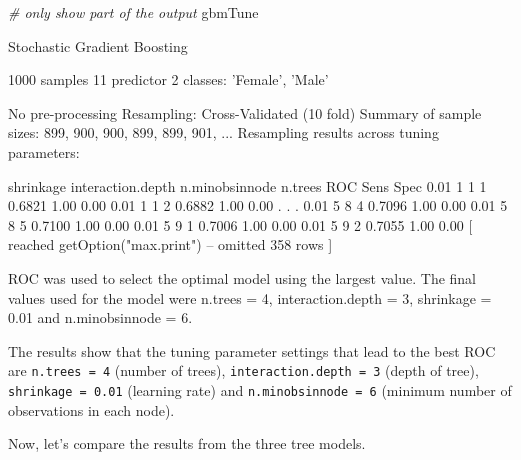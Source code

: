 \documentclass[12pt,]{krantz}
\makeatletter
\newenvironment{Shaded}{\begin{snugshade}}{\end{snugshade}}
\newcommand{\CommentTok}[1]{\textcolor[rgb]{0.37,0.37,0.37}{\textit{#1}}}
\newcommand{\NormalTok}[1]{#1}
\newenvironment{kframe}{%
\medskip{}
\setlength{\fboxsep}{.8em}
 \def\at@end@of@kframe{}%
 \ifinner\ifhmode%
  \def\at@end@of@kframe{\end{minipage}}%
  \begin{minipage}{\columnwidth}%
 \fi\fi%
 \def\FrameCommand##1{\hskip\@totalleftmargin \hskip-\fboxsep
 \colorbox{shadecolor}{##1}\hskip-\fboxsep
     \hskip-\linewidth \hskip-\@totalleftmargin \hskip\columnwidth}%
 \MakeFramed {\advance\hsize-\width
   \@totalleftmargin\z@ \linewidth\hsize
   \@setminipage}}%
 {\par\unskip\endMakeFramed%
 \at@end@of@kframe}
\renewenvironment{Shaded}{\begin{kframe}}{\end{kframe}}
\makeatother
\begin{document}
\begin{Shaded}
\begin{Highlighting}[]
\CommentTok{# only show part of the output}
\NormalTok{gbmTune}
\end{Highlighting}
\end{Shaded}

\begin{Shaded}
\begin{Highlighting}[]
\NormalTok{Stochastic Gradient Boosting }

\NormalTok{1000 samples}
\NormalTok{  11 predictor}
\NormalTok{   2 classes: 'Female', 'Male' }

\NormalTok{No pre-processing}
\NormalTok{Resampling: Cross-Validated (10 fold) }
\NormalTok{Summary of sample sizes: 899, 900, 900, 899, 899, 901, ... }
\NormalTok{Resampling results across tuning parameters:}

\NormalTok{shrinkage interaction.depth n.minobsinnode n.trees ROC    Sens Spec    }
\NormalTok{0.01      1                 1              1       0.6821 1.00 0.00}
\NormalTok{0.01      1                 1              2       0.6882 1.00 0.00}
\NormalTok{  .}
\NormalTok{  .}
\NormalTok{  .}
\NormalTok{0.01      5                 8              4       0.7096 1.00 0.00}
\NormalTok{0.01      5                 8              5       0.7100 1.00 0.00}
\NormalTok{0.01      5                 9              1       0.7006 1.00 0.00}
\NormalTok{0.01      5                 9              2       0.7055 1.00 0.00}
\NormalTok{ [ reached getOption("max.print") -- omitted 358 rows ]}

\NormalTok{ROC was used to select the optimal model using the largest value.}
\NormalTok{The final values used for the model were n.trees = 4, }
\NormalTok{interaction.depth = 3, shrinkage = 0.01 and n.minobsinnode = 6.}
\end{Highlighting}
\end{Shaded}

The results show that the tuning parameter settings that lead to the best ROC are \texttt{n.trees\ =\ 4} (number of trees), \texttt{interaction.depth\ =\ 3} (depth of tree), \texttt{shrinkage\ =\ 0.01} (learning rate) and \texttt{n.minobsinnode\ =\ 6} (minimum number of observations in each node).

Now, let's compare the results from the three tree models.
\end{document}
